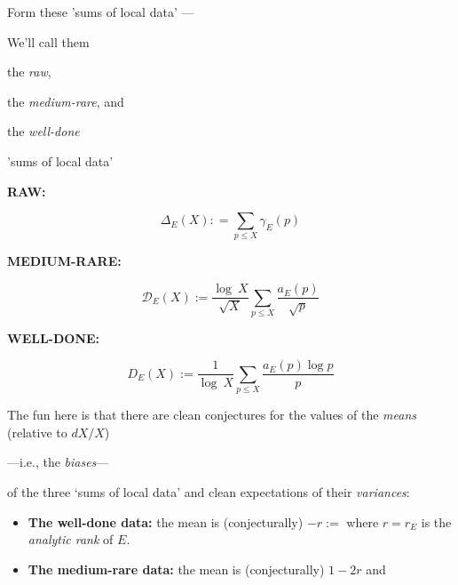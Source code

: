 \documentclass[12pt]{beamer}
\theoremstyle{definition}
\begin{document}
\begin{frame}\vskip20pt
{\Large  \vskip20pt  Form  these 'sums of local data' ---\vskip20pt

We'll call them \vskip10pt  \centerline{the {\it raw},}\vskip10pt  \centerline{the {\it medium-rare}, and }\vskip10pt \centerline{the {\it well-done}}\vskip20pt 'sums of local data' }\end{frame}
\begin{frame}\vskip20pt
{\Large  \vskip20pt
 \centerline{\bf RAW:} \vskip20pt  $$\Delta_E(X): =\sum_{p\le X}\gamma_E(p)$$} \end{frame}
\begin{frame}\vskip20pt
{\Large  \vskip20pt
 \centerline{\bf MEDIUM-RARE:}  \vskip20pt$${\mathcal D}_E(X):= {\frac{\log\ X}{\sqrt X}}\sum_{p \le X}{\frac{a_E(p)}{\sqrt p}}$$} \end{frame}
\begin{frame}\vskip20pt
{\Large  \vskip20pt
  \centerline{\bf WELL-DONE:} \vskip20pt$${D}_E(X):= {\frac{1}{\log\ X}}\sum_{p \le X}{\frac{a_E(p)\log p}{ p}}$$} \end{frame}
  
 \begin{frame}\vskip20pt
{\Large  \vskip20pt 
    
   The fun here is that there are clean conjectures for\vskip20pt the values of the {\it means} (relative to $dX/X$)\vskip20pt \centerline{---i.e., the {\it biases}---}\vskip20pt of the three `sums of local data' \vskip20pt and clean expectations of their {\it variances}:} \end{frame}
  
 \begin{frame}\vskip20pt
{\Large  \vskip20pt 
    
   
    \begin{itemize}
   \item {\bf The well-done data:} the  mean is (conjecturally) $-r:=$  where $r= r_E$ is the {\it analytic rank} of $E$.  \vskip20pt 
    
    \item {\bf The medium-rare data:} the  mean is  (conjecturally)  $1-2r$ and   \end{itemize} } \end{frame}
  
\end{document}
